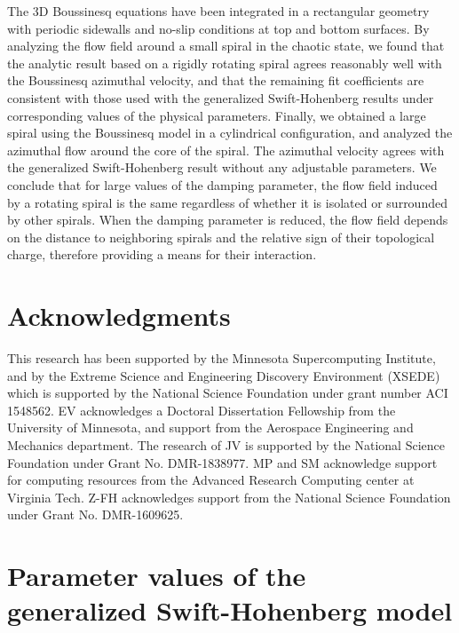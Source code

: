 \documentclass[preprint,prx,floatfix]{revtex4-1}
\begin{document}
The 3D Boussinesq equations have been integrated in a rectangular geometry with periodic sidewalls and no-slip conditions at top and bottom surfaces. By analyzing the flow field around a small spiral in the chaotic state, we found that the analytic result based on a rigidly rotating spiral agrees reasonably well with the Boussinesq azimuthal velocity, and that the remaining fit coefficients are consistent with those used with the generalized Swift-Hohenberg results under corresponding values of the physical parameters. Finally, we obtained a large spiral using the Boussinesq model in a cylindrical configuration, and analyzed the azimuthal flow around the core of the spiral. The azimuthal velocity agrees with the generalized Swift-Hohenberg result without any adjustable parameters. We conclude that for large values of the damping parameter, the flow field induced by a rotating spiral is the same regardless of whether it is isolated or surrounded by other spirals. When the damping parameter is reduced, the flow field depends on the distance to neighboring spirals and the relative sign of their topological charge, therefore providing a means for their interaction.

\section*{Acknowledgments}

This research has been supported by the Minnesota Supercomputing Institute, and by the Extreme Science and Engineering Discovery Environment (XSEDE) \cite{towns2014xsede} which is supported by the National Science Foundation under grant number ACI 1548562. EV acknowledges a Doctoral Dissertation Fellowship from the University of Minnesota, and support from the Aerospace Engineering and Mechanics department. The research of JV is supported by the National Science Foundation under Grant No. DMR-1838977. MP and SM acknowledge support for computing resources from the Advanced Research Computing center at Virginia Tech. Z-FH acknowledges support from the National Science Foundation under Grant No. DMR-1609625.

\appendix
\section{Parameter values of the generalized Swift-Hohenberg model}
\label{sec:ap}
\end{document}
